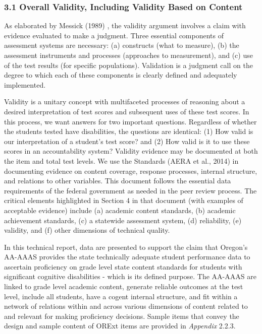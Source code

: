 \documentclass[]{article}
\begin{document}
\subsubsection{3.1 Overall Validity, Including Validity Based on
Content}\label{overall-validity-including-validity-based-on-content}

As elaborated by Messick (1989) , the validity argument involves a claim
with evidence evaluated to make a judgment. Three essential components
of assessment systems are necessary: (a) constructs (what to measure),
(b) the assessment instruments and processes (approaches to
measurement), and (c) use of the test results (for specific
populations). Validation is a judgment call on the degree to which each
of these components is clearly defined and adequately implemented.

Validity is a unitary concept with multifaceted processes of reasoning
about a desired interpretation of test scores and subsequent uses of
these test scores. In this process, we want answers for two important
questions. Regardless of whether the students tested have disabilities,
the questions are identical: (1) How valid is our interpretation of a
student's test score? and (2) How valid is it to use these scores in an
accountability system? Validity evidence may be documented at both the
item and total test levels. We use the Standards (AERA et al., 2014) in
documenting evidence on content coverage, response processes, internal
structure, and relations to other variables. This document follows the
essential data requirements of the federal government as needed in the
peer review process. The critical elements highlighted in Section 4 in
that document (with examples of acceptable evidence) include (a)
academic content standards, (b) academic achievement standards, (c) a
statewide assessment system, (d) reliability, (e) validity, and (f)
other dimensions of technical quality.

In this technical report, data are presented to support the claim that
Oregon's AA-AAAS provides the state technically adequate student
performance data to ascertain proficiency on grade level state content
standards for students with significant cognitive disabilities - which
is its defined purpose. The AA-AAAS are linked to grade level academic
content, generate reliable outcomes at the test level, include all
students, have a cogent internal structure, and fit within a network of
relations within and across various dimensions of content related to and
relevant for making proficiency decisions. Sample items that convey the
design and sample content of ORExt items are provided in \emph{Appendix}
2.2.3.
\end{document}
